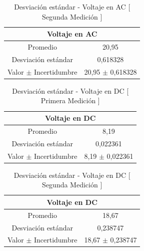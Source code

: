 \documentclass[letterpaper, 12pt]{report}
\begin{document}
\begin{table}[H]
	\begin{center}
		\begin{tabular}{|c|c|}
			\multicolumn{2}{c}{Voltaje en AC}                 \\ \hline
			Promedio                  & 20,95                 \\ \hline
			Desviación estándar       & 0,618328              \\ \hline
			Valor $\pm$ Incertidumbre & 20,95  $\pm$ 0,618328 \\ \hline
		\end{tabular}
		\caption{Desviación estándar - Voltaje en AC [ Segunda Medición ]}
	\end{center}
\end{table}

\begin{table}[H]
	\begin{center}
		\begin{tabular}{|c|c|}
			\multicolumn{2}{c}{Voltaje en DC}               \\ \hline
			Promedio                  & 8,19                \\ \hline
			Desviación estándar       & 0,022361            \\ \hline
			Valor $\pm$ Incertidumbre & 8,19 $\pm$ 0,022361 \\ \hline
		\end{tabular}
		\caption{Desviación estándar - Voltaje en DC [ Primera Medición ]}
	\end{center}
\end{table}

\begin{table}[H]
	\begin{center}
		\begin{tabular}{|c|c|}
			\multicolumn{2}{c}{Voltaje en DC}                \\ \hline
			Promedio                  & 18,67                \\ \hline
			Desviación estándar       & 0,238747             \\ \hline
			Valor $\pm$ Incertidumbre & 18,67 $\pm$ 0,238747 \\ \hline
		\end{tabular}
		\caption{Desviación estándar - Voltaje en DC [ Segunda Medición ]}
	\end{center}
\end{table}
\end{document}
